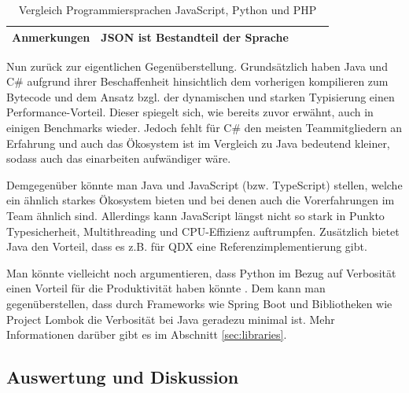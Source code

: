 \begin{table}[H]
\begin{tabular}{|p{3cm}|p{3.7cm}|p{3.7cm}|p{3.7cm}|}
    Anmerkungen                                                                                  & JSON ist Bestandteil der Sprache                                                 & ~                                                       & ~                                                                                                  \\ \hline
    \end{tabular}
    \caption {Vergleich Programmiersprachen JavaScript, Python und PHP}
    \label{tab:comp_pl2}
\end{table}

Nun zurück zur eigentlichen Gegenüberstellung. Grundsätzlich haben Java und C\# aufgrund ihrer Beschaffenheit hinsichtlich dem vorherigen kompilieren zum Bytecode und dem Ansatz bzgl. der dynamischen und starken Typisierung einen Performance-Vorteil. Dieser spiegelt sich, wie bereits zuvor erwähnt, auch in einigen Benchmarks wieder. Jedoch fehlt für C\# den meisten Teammitgliedern an Erfahrung und auch das Ökosystem ist im Vergleich zu Java bedeutend kleiner, sodass auch das einarbeiten aufwändiger wäre.

Demgegenüber könnte man Java und JavaScript (bzw. TypeScript) stellen, welche ein ähnlich starkes Ökosystem bieten und bei denen auch die Vorerfahrungen im Team ähnlich sind. Allerdings kann JavaScript längst nicht so stark in Punkto Typesicherheit, Multithreading und CPU-Effizienz auftrumpfen. Zusätzlich bietet Java den Vorteil, dass es z.B. für QDX eine Referenzimplementierung gibt.

Man könnte vielleicht noch argumentieren, dass Python im Bezug auf Verbosität einen Vorteil für die Produktivität haben könnte \cite{expressiveness}. Dem kann man gegenüberstellen, dass durch Frameworks wie Spring Boot und Bibliotheken wie Project Lombok die Verbosität bei Java geradezu minimal ist. Mehr Informationen darüber gibt es im Abschnitt \ref{sec:libraries}.

\subsection{Auswertung und Diskussion}

